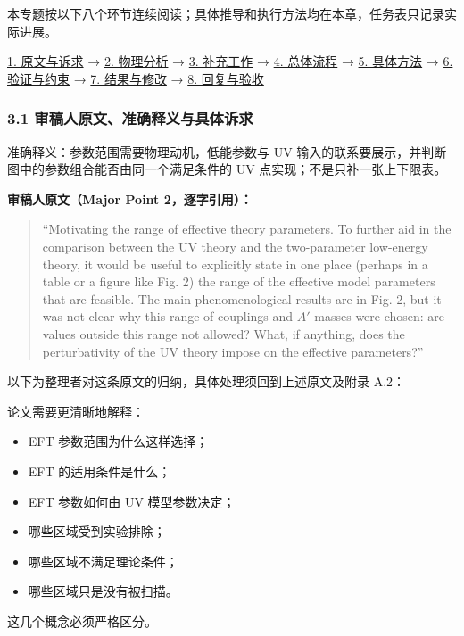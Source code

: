 \documentclass[
  chinese,
  UTF8]{ctexart}
\providecommand{\tightlist}{%
  \setlength{\itemsep}{0pt}\setlength{\parskip}{0pt}}
\begin{document}
本专题按以下八个环节连续阅读；具体推导和执行方法均在本章，任务表只记录实际进展。

\hyperref[major-2-step-1]{1. 原文与诉求} → \hyperref[major-2-step-2]{2.
物理分析} → \hyperref[major-2-step-3]{3. 补充工作} →
\hyperref[major-2-step-4]{4. 总体流程} → \hyperref[major-2-step-5]{5.
具体方法} → \hyperref[major-2-step-6]{6. 验证与约束} →
\hyperref[major-2-step-7]{7. 结果与修改} → \hyperref[major-2-step-8]{8.
回复与验收}

\subsubsection{3.1 审稿人原文、准确释义与具体诉求}\label{major-2-step-1}

准确释义：参数范围需要物理动机，低能参数与 UV
输入的联系要展示，并判断图中的参数组合能否由同一个满足条件的 UV
点实现；不是只补一张上下限表。

\textbf{审稿人原文（Major Point 2，逐字引用）：}

\begin{quote}
``Motivating the range of effective theory parameters. To further aid in
the comparison between the UV theory and the two-parameter low-energy
theory, it would be useful to explicitly state in one place (perhaps in
a table or a figure like Fig. 2) the range of the effective model
parameters that are feasible. The main phenomenological results are in
Fig. 2, but it was not clear why this range of couplings and \(A'\)
masses were chosen: are values outside this range not allowed? What, if
anything, does the perturbativity of the UV theory impose on the
effective parameters?''
\end{quote}

以下为整理者对这条原文的归纳，具体处理须回到上述原文及附录 A.2：

论文需要更清晰地解释：

\begin{itemize}
\tightlist
\item
  EFT 参数范围为什么这样选择；
\item
  EFT 的适用条件是什么；
\item
  EFT 参数如何由 UV 模型参数决定；
\item
  哪些区域受到实验排除；
\item
  哪些区域不满足理论条件；
\item
  哪些区域只是没有被扫描。
\end{itemize}

这几个概念必须严格区分。
\end{document}
